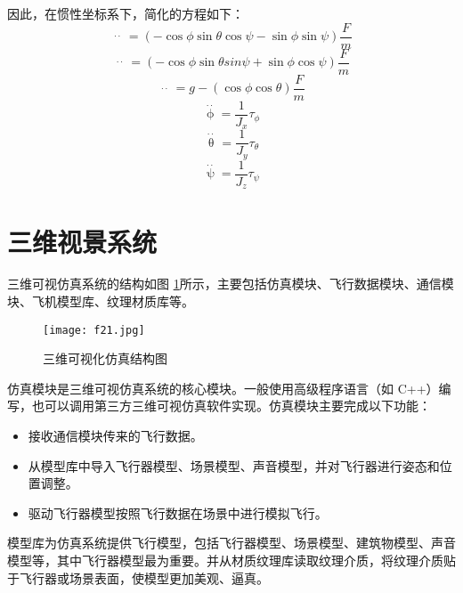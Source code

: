 因此，在惯性坐标系下，简化的方程如下：
\begin{equation}
\mathop {{p_n}}\limits^{ \cdot  \cdot }  = \left( { - \cos \phi \sin \theta \cos \psi  - \sin \phi \sin \psi } \right)\frac{F}{m}
\end{equation}
\begin{equation}
\mathop {{p_e}}\limits^{ \cdot  \cdot }  = \left( { - \cos \phi \sin \theta sin\psi  + \sin \phi \cos \psi } \right)\frac{F}{m}
\end{equation}
\begin{equation}
\mathop {{p_d}}\limits^{ \cdot  \cdot }  = g - \left( {\cos \phi \cos \theta } \right)\frac{F}{m}
\end{equation}
\begin{equation}
\mathop \phi \limits^{ \cdot  \cdot }  = \frac{1}{{{J_x}}}{\tau _\phi }
\end{equation}
\begin{equation}
\mathop \theta \limits^{ \cdot  \cdot }  = \frac{1}{{{J_y}}}{\tau _\theta }
\end{equation}
\begin{equation}
\mathop \psi \limits^{ \cdot  \cdot }  = \frac{1}{{{J_z}}}{\tau _\psi }
\end{equation}

\section{三维视景系统}\label{3}

三维可视仿真系统的结构如图 \ref{fig23}所示，主要包括仿真模块、飞行数据模块、通信模块、飞机模型库、纹理材质库等。
\vspace{-10pt}
\begin{figure}[!ht]
\centering
\texttt{[image: f21.jpg]}
\caption{三维可视化仿真结构图}
\label{fig23}
\end{figure}

仿真模块是三维可视仿真系统的核心模块。一般使用高级程序语言（如 C++）编写，也可以调用第三方三维可视仿真软件实现。仿真模块主要完成以下功能：
\begin{itemize}
  \item  接收通信模块传来的飞行数据。
  \item  从模型库中导入飞行器模型、场景模型、声音模型，并对飞行器进行姿态和位置调整。
  \item 驱动飞行器模型按照飞行数据在场景中进行模拟飞行。
\end{itemize}

模型库为仿真系统提供飞行模型，包括飞行器模型、场景模型、建筑物模型、声音模型等，其中飞行器模型最为重要。并从材质纹理库读取纹理介质，将纹理介质贴于飞行器或场景表面，使模型更加美观、逼真。

